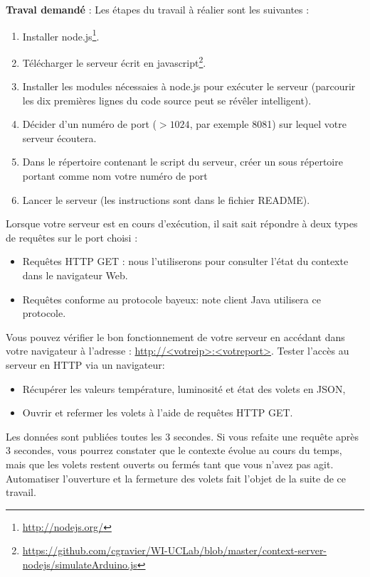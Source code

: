 \documentclass[a4paper,11pt,fleqn]{article}
\begin{document}
\textbf{Traval demandé} : Les étapes du travail à réalier sont les suivantes :
\begin{enumerate}
	\item Installer node.js\footnote{\url{http://nodejs.org/}}.
	\item Télécharger le serveur écrit en javascript\footnote{\url{https://github.com/cgravier/WI-UCLab/blob/master/context-server-nodejs/simulateArduino.js}}. 
	\item Installer les modules nécessaies à node.js pour exécuter le serveur (parcourir les dix premières lignes du code source peut se révêler intelligent).
	\item Décider d'un numéro de port ($>1024$, par exemple 8081) sur lequel votre serveur écoutera.
	\item Dans le répertoire contenant le script du serveur, créer un sous répertoire portant comme nom votre numéro de port
	\item Lancer le serveur (les instructions sont dans le fichier README).
\end{enumerate}

Lorsque votre serveur est en cours d'exécution, il sait sait répondre à deux types de requêtes sur le port choisi :
\begin{itemize}
	\item Requêtes HTTP GET : nous l'utiliserons pour consulter l'état du contexte dans le navigateur Web.
	\item Requêtes conforme au protocole bayeux: note client Java utilisera ce protocole.
\end{itemize}
\vspace{10pt}

Vous pouvez vérifier le bon fonctionnement de votre serveur en accédant dans votre navigateur à l'adresse : \url{http://<votreip>:<votreport>}. Tester l'accès au serveur en HTTP via un navigateur:
	\begin{itemize}
		\item Récupérer les valeurs température, luminosité et état des volets en JSON,
		\item Ouvrir et refermer les volets à l'aide de requêtes HTTP GET.
	\end{itemize}

Les données sont publiées toutes les 3 secondes. Si vous refaite une requête après 3 secondes, vous pourrez constater que le contexte évolue au cours du temps, mais que les volets restent ouverts ou fermés tant que vous n'avez pas agit. Automatiser l'ouverture et la fermeture des volets fait l'objet de la suite de ce travail.
\end{document}
